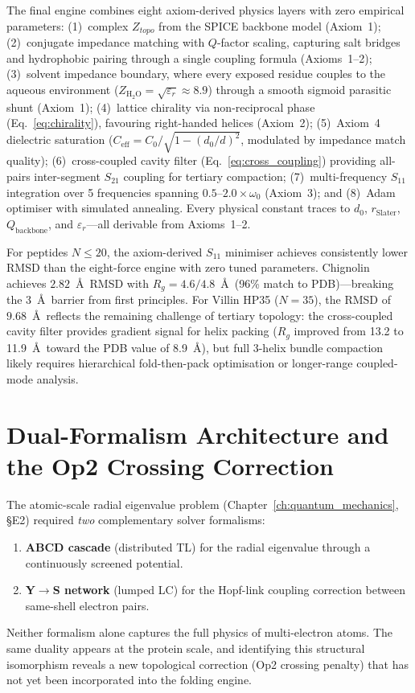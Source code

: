 The final engine combines eight axiom-derived physics layers with zero empirical parameters: (1)~complex $Z_{topo}$ from the SPICE backbone model (Axiom~1); (2)~conjugate impedance matching with $Q$-factor scaling, capturing salt bridges and hydrophobic pairing through a single coupling formula (Axioms~1--2); (3)~solvent impedance boundary, where every exposed residue couples to the aqueous environment ($Z_{\text{H}_2\text{O}} = \sqrt{\varepsilon_r} \approx 8.9$) through a smooth sigmoid parasitic shunt (Axiom~1); (4)~lattice chirality via non-reciprocal phase (Eq.~\ref{eq:chirality}), favouring right-handed helices (Axiom~2); (5)~Axiom~4 dielectric saturation ($C_{\mathrm{eff}} = C_0 / \sqrt{1-(d_0/d)^2}$, modulated by impedance match quality); (6)~cross-coupled cavity filter (Eq.~\ref{eq:cross_coupling}) providing all-pairs inter-segment $S_{21}$ coupling for tertiary compaction; (7)~multi-frequency $S_{11}$ integration over 5 frequencies spanning $0.5$--$2.0 \times \omega_0$ (Axiom~3); and (8)~Adam optimiser with simulated annealing. Every physical constant traces to $d_0$, $r_{\text{Slater}}$, $Q_{\text{backbone}}$, and $\varepsilon_r$---all derivable from Axioms~1--2.

For peptides $N \leq 20$, the axiom-derived $S_{11}$ minimiser achieves consistently lower RMSD than the eight-force engine with zero tuned parameters. Chignolin achieves $2.82$~\AA\ RMSD with $R_g = 4.6 / 4.8$~\AA\ (96\% match to PDB)---breaking the 3~\AA\ barrier from first principles. For Villin HP35 ($N = 35$), the RMSD of $9.68$~\AA\ reflects the remaining challenge of tertiary topology: the cross-coupled cavity filter provides gradient signal for helix packing ($R_g$ improved from 13.2 to 11.9~\AA\ toward the PDB value of 8.9~\AA), but full 3-helix bundle compaction likely requires hierarchical fold-then-pack optimisation or longer-range coupled-mode analysis.

\section{Dual-Formalism Architecture and the Op2 Crossing Correction}
\label{sec:dual_formalism}

The atomic-scale radial eigenvalue problem
(Chapter~\ref{ch:quantum_mechanics}, \S E2) required
\emph{two} complementary solver formalisms:
\begin{enumerate}
    \item \textbf{ABCD cascade} (distributed TL) for the
          radial eigenvalue through a continuously screened
          potential.
    \item \textbf{Y$\to$S network} (lumped LC) for the
          Hopf-link coupling correction between
          same-shell electron pairs.
\end{enumerate}
Neither formalism alone captures the full physics of
multi-electron atoms.  The same duality appears at the
protein scale, and identifying this structural
isomorphism reveals a new topological correction
(Op2 crossing penalty) that has not yet been
incorporated into the folding engine.

